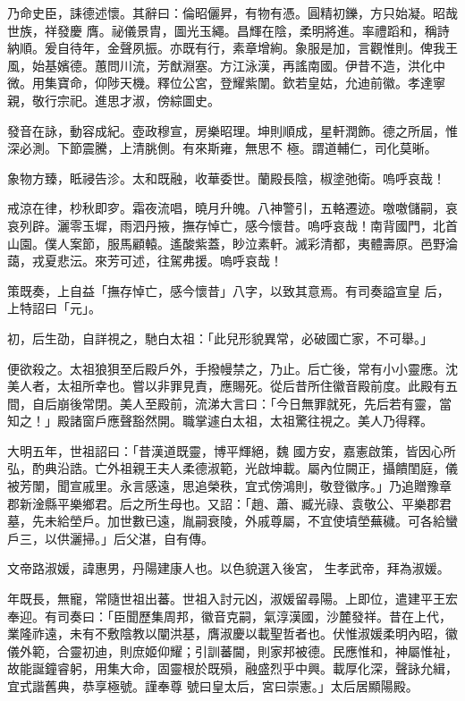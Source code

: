 \begin{pinyinscope}
 乃命史臣，誄德述懷。其辭曰：倫昭儷昇，有物有憑。圓精初鑠，方只始凝。昭哉世族，祥發慶
 膺。祕儀景胄，圖光玉繩。昌輝在陰，柔明將進。率禮蹈和，稱詩納順。爰自待年，金聲夙振。亦既有行，素章增絢。象服是加，言觀惟則。俾我王風，始基嬪德。蕙問川流，芳猷淵塞。方江泳漢，再謠南國。伊昔不造，洪化中微。用集寶命，仰陟天機。釋位公宮，登耀紫闈。欽若皇姑，允迪前徽。孝達寧親，敬行宗祀。進思才淑，傍綜圖史。



 發音在詠，動容成紀。壺政穆宣，房樂昭理。坤則順成，星軒潤飾。德之所屆，惟深必測。下節震騰，上清朓側。有來斯雍，無思不
 極。謂道輔仁，司化莫晰。



 象物方臻，眡祲告沴。太和既融，收華委世。蘭殿長陰，椒塗弛衛。嗚呼哀哉！



 戒涼在律，杪秋即穸。霜夜流唱，曉月升魄。八神警引，五輅遷迹。噭噭儲嗣，哀哀列辟。灑零玉墀，雨泗丹掖，撫存悼亡，感今懷昔。嗚呼哀哉！南背國門，北首山園。僕人案節，服馬顧轅。遙酸紫蓋，眇泣素軒。滅彩清都，夷體壽原。邑野淪藹，戎夏悲沄。來芳可述，往駕弗援。嗚呼哀哉！



 策既奏，上自益「撫存悼亡，感今懷昔」八字，以致其意焉。有司奏謚宣皇
 后，上特詔曰「元」。



 初，后生劭，自詳視之，馳白太祖：「此兒形貌異常，必破國亡家，不可舉。」



 便欲殺之。太祖狼狽至后殿戶外，手撥幔禁之，乃止。后亡後，常有小小靈應。沈美人者，太祖所幸也。嘗以非罪見責，應賜死。從后昔所住徽音殿前度。此殿有五間，自后崩後常閉。美人至殿前，流涕大言曰：「今日無罪就死，先后若有靈，當知之！」殿諸窗戶應聲豁然開。職掌遽白太祖，太祖驚往視之。美人乃得釋。



 大明五年，世祖詔曰：「昔漢道既靈，博平輝絕，魏
 國方安，嘉憲啟策，皆因心所弘，酌典沿誥。亡外祖親王夫人柔德淑範，光啟坤載。屬內位闕正，攝饋閨庭，儀被芳闈，聞宣戚里。永言感遠，思追榮秩，宜式傍鴻則，敬登徽序。」乃追贈豫章郡新淦縣平樂鄉君。后之所生母也。又詔：「趙、蕭、臧光祿、袁敬公、平樂郡君墓，先未給塋戶。加世數已遠，胤嗣衰陵，外戚尊屬，不宜使墳塋蕪穢。可各給蠻戶三，以供灑掃。」后父湛，自有傳。



 文帝路淑媛，諱惠男，丹陽建康人也。以色貌選入後宮，
 生孝武帝，拜為淑媛。



 年既長，無寵，常隨世祖出蕃。世祖入討元凶，淑媛留尋陽。上即位，遣建平王宏奉迎。有司奏曰：「臣聞歷集周邦，徽音克嗣，氣淳漢國，沙麓發祥。昔在上代，業隆祚遠，未有不敷陰教以闡洪基，膺淑慶以載聖哲者也。伏惟淑媛柔明內昭，徽儀外範，合靈初迪，則庶姬仰耀；引訓蕃閫，則家邦被德。民應惟和，神屬惟祉，故能誕鐘睿躬，用集大命，固靈根於既殞，融盛烈乎中興。載厚化深，聲詠允緝，宜式諧舊典，恭享極號。謹奉尊
 號曰皇太后，宮曰崇憲。」太后居顯陽殿。




\end{pinyinscope}
